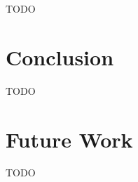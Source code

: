 \documentclass[conference]{IEEEtran}
\begin{document}
TODO


\section{Conclusion}\label{sec:conc}

TODO


\section{Future Work}\label{sec:futwork}

TODO


\printbibliography
\end{document}
